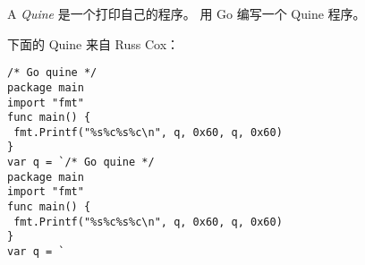 \begin{Exercise}[title={Quine},difficulty=9]
A \emph{Quine} 是一个打印自己的程序。
\label{ex:quine}
\Question\label{ex:quine q1} 用 Go 编写一个 Quine 程序。
\end{Exercise}

\begin{Answer}
\Question 
下面的 Quine 来自 Russ Cox：
\begin{lstlisting}
/* Go quine */
package main
import "fmt"
func main() {
 fmt.Printf("%s%c%s%c\n", q, 0x60, q, 0x60)
}
var q = `/* Go quine */
package main
import "fmt"
func main() {
 fmt.Printf("%s%c%s%c\n", q, 0x60, q, 0x60)
}
var q = `
\end{lstlisting}
\end{Answer}
